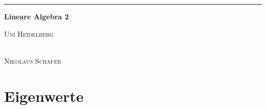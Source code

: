 \documentclass[10pt,a4paper,numbers=endperiod]{scrartcl}
\theoremstyle{definition}
\def\Namen{} %
\def\Datum{} %
\begin{document}
\Namen \hfill \Datum\par
\vspace{0.25\baselineskip}
\hrule
\vspace{\baselineskip}
\begin{center}
{\LARGE\textbf{Lineare Algebra 2}}\par
\vspace{0.25\baselineskip}
{\large\textsc{Uni Heidelberg}}
\end{center}

\vspace{\baselineskip}
\vspace{\baselineskip}
\vspace{\baselineskip}
\vspace{\baselineskip}
\vspace{\baselineskip}
\vspace{\baselineskip}
\vspace{\baselineskip}
\vspace{\baselineskip}
\vspace{\baselineskip}
\vspace{\baselineskip}
\vspace{\baselineskip}  
\vspace{\baselineskip}
\vspace{\baselineskip}
\vspace{\baselineskip}
\vspace{\baselineskip}
\vspace{\baselineskip}
\vspace{\baselineskip}
\vspace{\baselineskip}
\vspace{\baselineskip}
\vspace{\baselineskip}
\vspace{\baselineskip}

\begin{center}
	{\large{}}\\
	\vspace{0.3\baselineskip}
	{\large\textsc{Nikolaus Schäfer}}
\end{center}

\newpage
\vspace{0.125\baselineskip}
\tableofcontents %
\newpage
\section{Eigenwerte}
\vspace{0.2\baselineskip}
\end{document}
